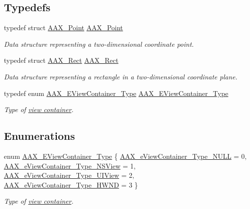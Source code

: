 \subsection*{Typedefs}
\begin{DoxyCompactItemize}
\item 
typedef struct \hyperlink{a00119}{A\+A\+X\+\_\+\+Point} \hyperlink{a00214_aace06b5ca898ac66c68fe5f5c598f0b6}{A\+A\+X\+\_\+\+Point}
\begin{DoxyCompactList}\small\item\em Data structure representing a two-\/dimensional coordinate point. \end{DoxyCompactList}\item 
typedef struct \hyperlink{a00120}{A\+A\+X\+\_\+\+Rect} \hyperlink{a00214_a85ca9d563f37484d29b66a2e4ec6598f}{A\+A\+X\+\_\+\+Rect}
\begin{DoxyCompactList}\small\item\em Data structure representing a rectangle in a two-\/dimensional coordinate plane. \end{DoxyCompactList}\item 
typedef enum \hyperlink{a00214_a89d5cb8c7fdb11f34e695fb0e057b764}{A\+A\+X\+\_\+\+E\+View\+Container\+\_\+\+Type} \hyperlink{a00214_ab4c36de253fc80b541eb51074c64caef}{A\+A\+X\+\_\+\+E\+View\+Container\+\_\+\+Type}
\begin{DoxyCompactList}\small\item\em Type of \hyperlink{a00117}{view container}. \end{DoxyCompactList}\end{DoxyCompactItemize}
\subsection*{Enumerations}
\begin{DoxyCompactItemize}
\item 
enum \hyperlink{a00214_a89d5cb8c7fdb11f34e695fb0e057b764}{A\+A\+X\+\_\+\+E\+View\+Container\+\_\+\+Type} \{ \hyperlink{a00214_a89d5cb8c7fdb11f34e695fb0e057b764adf9ab6d93d9a35fcab5f7a0d24a2c308}{A\+A\+X\+\_\+e\+View\+Container\+\_\+\+Type\+\_\+\+N\+U\+L\+L} = 0, 
\hyperlink{a00214_a89d5cb8c7fdb11f34e695fb0e057b764a7be25786681e17b1a30c62579ab8591a}{A\+A\+X\+\_\+e\+View\+Container\+\_\+\+Type\+\_\+\+N\+S\+View} = 1, 
\hyperlink{a00214_a89d5cb8c7fdb11f34e695fb0e057b764aaabb8401d78697a273fe3983c3f23160}{A\+A\+X\+\_\+e\+View\+Container\+\_\+\+Type\+\_\+\+U\+I\+View} = 2, 
\hyperlink{a00214_a89d5cb8c7fdb11f34e695fb0e057b764a98a127ce6e567cb18c07ac347bb09255}{A\+A\+X\+\_\+e\+View\+Container\+\_\+\+Type\+\_\+\+H\+W\+N\+D} = 3
 \}
\begin{DoxyCompactList}\small\item\em Type of \hyperlink{a00117}{view container}. \end{DoxyCompactList}\end{DoxyCompactItemize}
